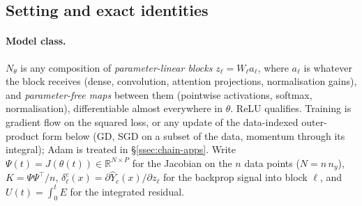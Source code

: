\subsection{Setting and exact identities}
\label{ssec:chain-identities}

\paragraph{Model class.} $N_\theta$ is any composition of \emph{parameter-linear
blocks} $z_\ell = W_\ell a_\ell$, where $a_\ell$ is whatever the block receives
(dense, convolution, attention projections, normalisation gains), and
\emph{parameter-free maps} between them (pointwise activations, softmax,
normalisation), differentiable almost everywhere in $\theta$. ReLU qualifies.
Training is gradient flow on the squared loss, or any update of the
data-indexed outer-product form below (GD, SGD on a subset of the data,
momentum through its integral); Adam is treated in \S\ref{ssec:chain-apps}.
Write $\Psi(t)=J(\theta(t))\in\mathbb R^{N\times P}$ for the Jacobian on the $n$
data points ($N=n\,n_y$), $K=\Psi\Psi^{\!\top}/n$, $\delta_\ell^c(x)=\partial
\hat Y_c(x)/\partial z_\ell$ for the backprop signal into block $\ell$, and
$U(t)=\int_0^t E$ for the integrated residual.

